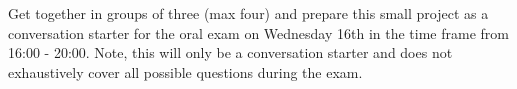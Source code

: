 \begin{tcolorbox}[enhanced jigsaw,breakable,pad at break*=1mm,
    colback=blue!5!white,colframe=babyblueeyes,title=Exercises]
    Get together in groups of three (max four) and prepare this small project as a conversation starter for the oral exam on Wednesday 16th in the time frame from 16:00 - 20:00. Note, this will only be a conversation starter and does not exhaustively cover all possible questions during the exam. 
\end{tcolorbox}